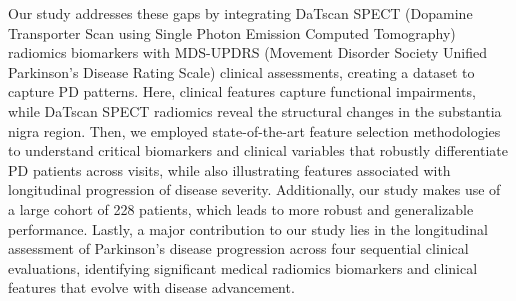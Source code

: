 \documentclass{article}
\begin{document}
Our study addresses these gaps by integrating DaTscan SPECT (Dopamine Transporter Scan using Single Photon Emission Computed Tomography) radiomics biomarkers with MDS-UPDRS (Movement Disorder Society Unified Parkinson’s Disease Rating Scale) clinical assessments, creating a dataset to capture PD patterns. Here, clinical features capture functional impairments, while DaTscan SPECT radiomics reveal the structural changes in the substantia nigra region. Then, we employed state-of-the-art feature selection methodologies to understand critical biomarkers and clinical variables that robustly differentiate PD patients across visits, while also illustrating features associated with longitudinal progression of disease severity. Additionally, our study makes use of a large cohort of 228 patients, which leads to more robust and generalizable performance. Lastly, a major contribution to our study lies in the longitudinal assessment of Parkinson's disease progression across four sequential clinical evaluations, identifying significant medical radiomics biomarkers and clinical features that evolve with disease advancement.



\end{document}
